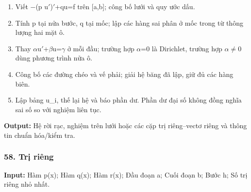 \begin{enumerate}

\item Viết \ensuremath{-}(\allowbreak{}p u\ensuremath{\prime})\ensuremath{\prime}+\allowbreak{}qu=\allowbreak{}f trên [a,\allowbreak{}b];\allowbreak{} công bố lưới và quy ước dấu.

\item Tính p tại nửa bước,\allowbreak{} q tại mốc;\allowbreak{} lập các hàng sai phân ở mốc trong từ thông lượng hai mặt ô.

\item Thay \ensuremath{\alpha}u\ensuremath{\prime}+\allowbreak{}\ensuremath{\beta}u=\allowbreak{}\ensuremath{\gamma} ở mỗi đầu;\allowbreak{} trường hợp \ensuremath{\alpha}=\allowbreak{}0 là Dirichlet,\allowbreak{} trường hợp \ensuremath{\alpha}\ensuremath{\ne}0 dùng phương trình nửa ô.

\item Công bố các đường chéo và vế phải;\allowbreak{} giải hệ băng đã lập,\allowbreak{} giữ đủ các hàng biên.

\item Lập bảng u\_i,\allowbreak{} thế lại hệ và báo phần dư. Phần dư đại số không đồng nghĩa sai số so với nghiệm liên tục.

\end{enumerate}

\textbf{Output:} Hệ rời rạc,\allowbreak{} nghiệm trên lưới hoặc các cặp trị riêng–vectơ riêng và thông tin chuẩn hóa/\allowbreak{}kiểm tra.

\examplebreak\subsubsection*{58. Trị riêng}

\textbf{Input:} Hàm p(\allowbreak{}x);\allowbreak{} Hàm q(\allowbreak{}x);\allowbreak{} Hàm r(\allowbreak{}x);\allowbreak{} Đầu đoạn a;\allowbreak{} Cuối đoạn b;\allowbreak{} Bước h;\allowbreak{} Số trị riêng nhỏ nhất.

